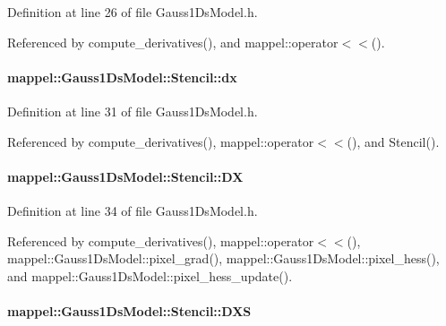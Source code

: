 Definition at line 26 of file Gauss1\+Ds\+Model.\+h.



Referenced by compute\+\_\+derivatives(), and mappel\+::operator$<$$<$().

\paragraph[{\texorpdfstring{dx}{dx}}]{ mappel\+::\+Gauss1\+Ds\+Model\+::\+Stencil\+::dx}\hypertarget{classmappel_1_1Gauss1DsModel_1_1Stencil_a89a81cafd54335711f4ae04c0bd8fb26}{}\label{classmappel_1_1Gauss1DsModel_1_1Stencil_a89a81cafd54335711f4ae04c0bd8fb26}


Definition at line 31 of file Gauss1\+Ds\+Model.\+h.



Referenced by compute\+\_\+derivatives(), mappel\+::operator$<$$<$(), and Stencil().

\paragraph[{\texorpdfstring{DX}{DX}}]{ mappel\+::\+Gauss1\+Ds\+Model\+::\+Stencil\+::\+DX}\hypertarget{classmappel_1_1Gauss1DsModel_1_1Stencil_a6f39d486d37c774ac2509a403a19520e}{}\label{classmappel_1_1Gauss1DsModel_1_1Stencil_a6f39d486d37c774ac2509a403a19520e}


Definition at line 34 of file Gauss1\+Ds\+Model.\+h.



Referenced by compute\+\_\+derivatives(), mappel\+::operator$<$$<$(), mappel\+::\+Gauss1\+Ds\+Model\+::pixel\+\_\+grad(), mappel\+::\+Gauss1\+Ds\+Model\+::pixel\+\_\+hess(), and mappel\+::\+Gauss1\+Ds\+Model\+::pixel\+\_\+hess\+\_\+update().

\paragraph[{\texorpdfstring{D\+XS}{DXS}}]{ mappel\+::\+Gauss1\+Ds\+Model\+::\+Stencil\+::\+D\+XS}\hypertarget{classmappel_1_1Gauss1DsModel_1_1Stencil_a0165665a066559026c1c66f75d825a47}{}\label{classmappel_1_1Gauss1DsModel_1_1Stencil_a0165665a066559026c1c66f75d825a47}



